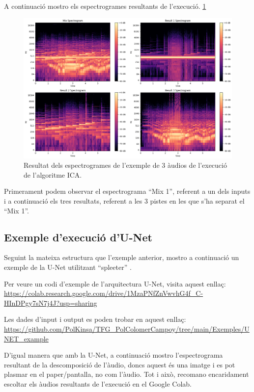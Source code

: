 \documentclass[10pt,a4paper,twocolumn,twoside]{article}
\begin{document}
A continuació mostro els espectrogrames resultants de l'execució.
\ref{fig:ica-exemple-3-audios}
\begin{figure}[h]
    \centering
    \includegraphics[width=1\linewidth]{img/ica_results/resultICA.png}
    \caption{Resultat dels espectrogrames de l'exemple de 3 àudios de l'execució de l'algoritme ICA.}
    \label{fig:ica-exemple-3-audios}
\end{figure}
Primerament podem observar el espectrograma ``Mix 1'', referent a un dels inputs i a continuació els tres resultats, referent a les 3 pistes en les que s'ha separat el ``Mix 1''.

\subsection{Exemple d'execució d'U-Net}

Seguint la mateixa estructura que l'exemple anterior, mostro a continuació un exemple de la U-Net utilitzant ``spleeter'' \cite{spleeter2020}.

Per veure un codi d'exemple de l'arquitectura U-Net, visita aquest enllaç:
\url{https://colab.research.google.com/drive/1MzaPNfZnVwvhG4f_C-HInDPgy7sN7j4J?usp=sharing}

Les dades d'input i output es poden trobar en aquest enllaç:
\url{https://github.com/PolKinsa/TFG_PolColomerCampoy/tree/main/Exemples/UNET_example}

D'igual manera que amb la U-Net, a continuació mostro l'espectrograma resultant de la descomposició de l'àudio, doncs aquest és una imatge i es pot plasmar en el paper/pantalla, no com l'àudio. Tot i això, recomano encaridament escoltar els àudios resultants de l'execució en el Google Colab. 
\end{document}
